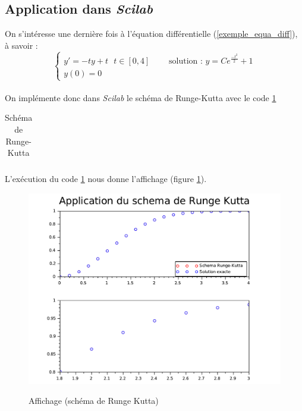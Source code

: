 \documentclass[a4paper,10pt]{report}
\begin{document}
\subsection{Application dans \textit{Scilab}}
On s'intéresse une dernière fois à l'équation différentielle (\ref{exemple_equa_diff}), à savoir :\\
\begin{equation*}
\left\lbrace
\begin{array}{lll}
y'=-ty+t \ \ \ t \in [0,4] & \text{    } & \text{solution : }y=Ce^{\frac{-t^2}{2}}+1 \\
y(0)=0
\end{array}\right.
\end{equation*} \\
On implémente donc dans \textit{Scilab} le schéma de Runge-Kutta avec le code \ref{code_rungekutta}
\begin{table}[H]
\caption{Schéma de Runge-Kutta}
\begin{tabular}{l}

\label{code_rungekutta}
\end{tabular}
\end{table}

L'exécution du code \ref{code_rungekutta} nous donne l'affichage (figure \ref{graph_rungekutta}).
\begin{figure}[H]
\centering
\caption{Affichage (schéma de Runge Kutta)}
\includegraphics[width=\textwidth]{runge_kutta.pdf}
\label{graph_rungekutta}
\end{figure}
\end{document}
